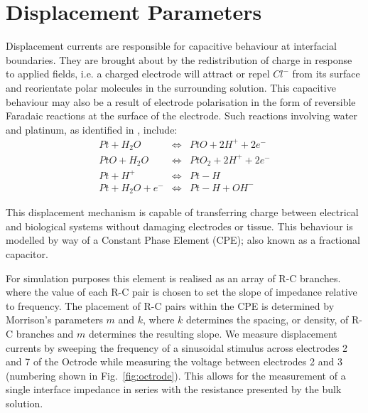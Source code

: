 \documentclass[journal, a4paper]{IEEEtran}
\begin{document}
\section{Displacement Parameters}
{
    \color{blue}
Displacement currents are responsible for capacitive behaviour at interfacial boundaries.
They are brought about by the redistribution of charge in response to applied fields, i.e. a charged electrode will attract or repel $Cl^{-}$ from its surface and reorientate polar molecules in the surrounding solution. This capacitive behaviour may also be a result of electrode polarisation in the form of reversible Faradaic reactions at the surface of the electrode.
Such reactions involving water and platinum, as identified in \cite{Horch2004,Mohtashami2011}, include:
    \begin{eqnarray}
        Pt + H_{2}O &\Leftrightarrow& PtO + 2 H^{+} + 2 e^{-}\\
        PtO + H_{2}O &\Leftrightarrow& PtO_{2} + 2 H^{+} + 2e^{-}\\
        Pt + H^{+} & \Leftrightarrow & Pt-H\\
        Pt + H_{2}O + e^{-} &\Leftrightarrow& Pt-H+OH^{-}
    \end{eqnarray}

This displacement mechanism is capable of transferring charge between electrical and biological systems without damaging electrodes or tissue. \cite{Horch2004}
This behaviour is modelled by way of a Constant Phase Element (CPE); also known as a fractional capacitor.
}
{
    \color{blue}
For simulation purposes this element is realised as an array of R-C branches.~\cite{ScottSingle2013,Morrison59,Elwakil10} where the value of each R-C pair is chosen to set the slope of impedance relative to frequency. The placement of R-C pairs within the CPE is determined by Morrison's parameters $m$ and $k$, where $k$ determines the spacing, or density, of R-C branches and $m$ determines the resulting slope.
}
We measure displacement currents by sweeping the frequency of a sinusoidal stimulus across electrodes 2 and 7 of the Octrode while measuring the voltage between electrodes 2 and 3 (numbering shown in Fig.~\ref{fig:octrode}). 
This allows for the measurement of a single interface impedance in series with the resistance presented by the bulk solution. 
\end{document}

